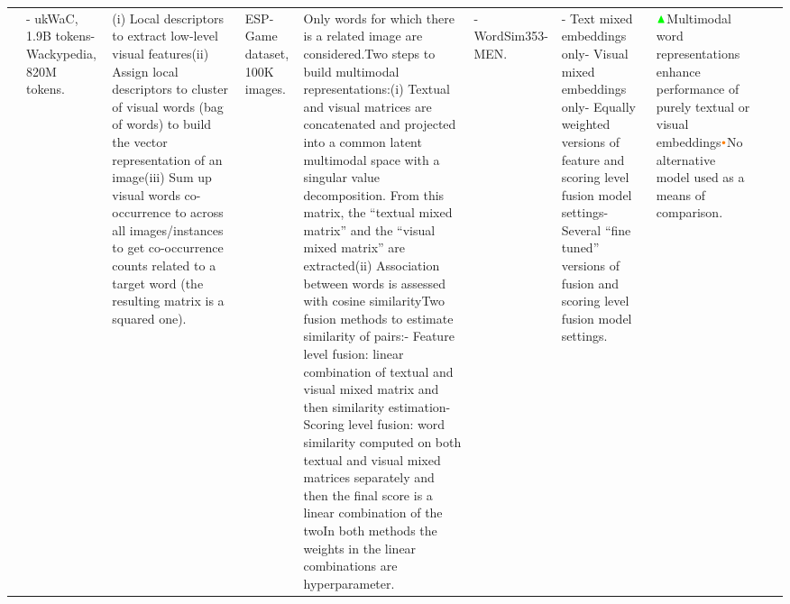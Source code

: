 \documentclass[
]{krantz}
\begin{document}
\begin{longtable}[]{@{}llllllllll@{}}
\begin{minipage}[t]{0.04\columnwidth}
\end{minipage} & \begin{minipage}[t]{0.02\columnwidth}\raggedright
- ukWaC, 1.9B tokens- Wackypedia, 820M tokens.\strut
\end{minipage} & \begin{minipage}[t]{0.07\columnwidth}\raggedright
(i) Local descriptors to extract low-level visual features(ii) Assign local descriptors to cluster of visual words (bag of words) to build the vector representation of an image(iii) Sum up visual words co-occurrence to across all images/instances to get co-occurrence counts related to a target word (the resulting matrix is a squared one).\strut
\end{minipage} & \begin{minipage}[t]{0.05\columnwidth}\raggedright
ESP-Game dataset, 100K images.\strut
\end{minipage} & \begin{minipage}[t]{0.25\columnwidth}\raggedright
Only words for which there is a related image are considered.Two steps to build multimodal representations:(i) Textual and visual matrices are concatenated and projected into a common latent multimodal space with a singular value decomposition. From this matrix, the ``textual mixed matrix'' and the ``visual mixed matrix'' are extracted(ii) Association between words is assessed with cosine similarityTwo fusion methods to estimate similarity of pairs:- Feature level fusion: linear combination of textual and visual mixed matrix and then similarity estimation- Scoring level fusion: word similarity computed on both textual and visual mixed matrices separately and then the final score is a linear combination of the twoIn both methods the weights in the linear combinations are hyperparameter.\strut
\end{minipage} & \begin{minipage}[t]{0.08\columnwidth}\raggedright
- WordSim353- MEN.\strut
\end{minipage} & \begin{minipage}[t]{0.05\columnwidth}\raggedright
- Text mixed embeddings only- Visual mixed embeddings only- Equally weighted versions of feature and scoring level fusion model settings- Several ``fine tuned'' versions of fusion and scoring level fusion model settings.\strut
\end{minipage} & \begin{minipage}[t]{0.13\columnwidth}\raggedright
\(\color{green}\blacktriangle\)Multimodal word representations enhance performance of purely textual or visual embeddings\(\color{orange}\bullet\)No alternative model used as a means of comparison.\strut

\end{minipage}
\end{longtable}
\end{document}
